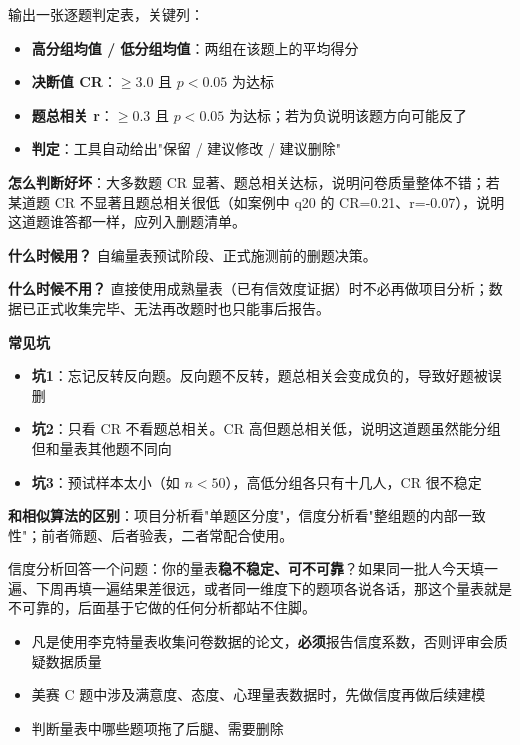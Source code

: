 \begin{algoresult}
输出一张逐题判定表，关键列：
\begin{itemize}
    \item \textbf{高分组均值 / 低分组均值}：两组在该题上的平均得分
    \item \textbf{决断值 CR}：$\geq 3.0$ 且 $p<0.05$ 为达标
    \item \textbf{题总相关 r}：$\geq 0.3$ 且 $p<0.05$ 为达标；若为负说明该题方向可能反了
    \item \textbf{判定}：工具自动给出"保留 / 建议修改 / 建议删除"
\end{itemize}

\textbf{怎么判断好坏}：大多数题 CR 显著、题总相关达标，说明问卷质量整体不错；若某道题 CR 不显著且题总相关很低（如案例中 q20 的 CR=0.21、r=-0.07），说明这道题谁答都一样，应列入删题清单。
\end{algoresult}

\begin{algonotes}
\textbf{什么时候用？} 自编量表预试阶段、正式施测前的删题决策。

\textbf{什么时候不用？} 直接使用成熟量表（已有信效度证据）时不必再做项目分析；数据已正式收集完毕、无法再改题时也只能事后报告。

\textbf{常见坑}
\begin{itemize}
    \item \textbf{坑1}：忘记反转反向题。反向题不反转，题总相关会变成负的，导致好题被误删
    \item \textbf{坑2}：只看 CR 不看题总相关。CR 高但题总相关低，说明这道题虽然能分组但和量表其他题不同向
    \item \textbf{坑3}：预试样本太小（如 $n<50$），高低分组各只有十几人，CR 很不稳定
\end{itemize}

\textbf{和相似算法的区别}：项目分析看"单题区分度"，信度分析看"整组题的内部一致性"；前者筛题、后者验表，二者常配合使用。
\end{algonotes}


\begin{algointro}
信度分析回答一个问题：你的量表\textbf{稳不稳定、可不可靠}？如果同一批人今天填一遍、下周再填一遍结果差很远，或者同一维度下的题项各说各话，那这个量表就是不可靠的，后面基于它做的任何分析都站不住脚。
\end{algointro}

\begin{algoscene}
\begin{itemize}
    \item 凡是使用李克特量表收集问卷数据的论文，\textbf{必须}报告信度系数，否则评审会质疑数据质量
    \item 美赛 C 题中涉及满意度、态度、心理量表数据时，先做信度再做后续建模
    \item 判断量表中哪些题项拖了后腿、需要删除
\end{itemize}
\end{algoscene}

